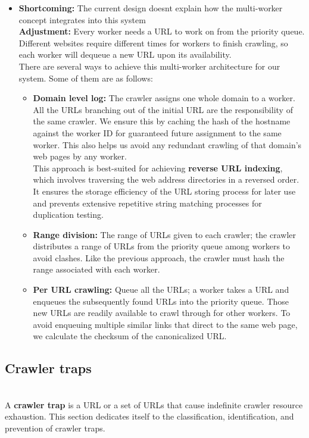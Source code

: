 \begin{itemize}
\item
\protect{}\label{dx5f30CEIJOzYG7tOly1q}
\textbf{Shortcoming:} The current design doesn\textquotesingle t explain how the multi-worker concept integrates into this system\\
\textbf{Adjustment:} Every worker needs a URL to work on from the priority queue. Different websites require different times for workers to finish crawling, so each worker will dequeue a new URL upon its availability.\\
There are several ways to achieve this multi-worker architecture for our system. Some of them are as follows:

\begin{itemize}
\item
\textbf{Domain level log:} The crawler assigns one whole domain to a worker. All the URLs branching out of the initial URL are the responsibility of the same crawler. We ensure this by caching the hash of the hostname against the worker ID for guaranteed future assignment to the same worker. This also helps us avoid any redundant crawling of that domain's web pages by any worker.\\
This approach is best-suited for achieving \textbf{reverse URL indexing}, which involves traversing the web address directories in a reversed order. It ensures the storage efficiency of the URL storing process for later use and prevents extensive repetitive string matching processes for duplication testing.
\item
\textbf{Range division:} The range of URLs given to each crawler; the crawler distributes a range of URLs from the priority queue among workers to avoid clashes. Like the previous approach, the crawler must hash the range associated with each worker.
\item
\textbf{Per URL crawling:} Queue all the URLs; a worker takes a URL and enqueues the subsequently found URLs into the priority queue. Those new URLs are readily available to crawl through for other workers. To avoid enqueuing multiple similar links that direct to the same web page, we calculate the checksum of the canonicalized URL.
\end{itemize}
\end{itemize}

\subsection{Crawler traps}\label{h2T5azDMjfQifa9Scn3AR}
\\
A \textbf{crawler trap} is a URL or a set of URLs that cause indefinite crawler resource exhaustion. This section dedicates itself to the classification, identification, and prevention of crawler traps.

